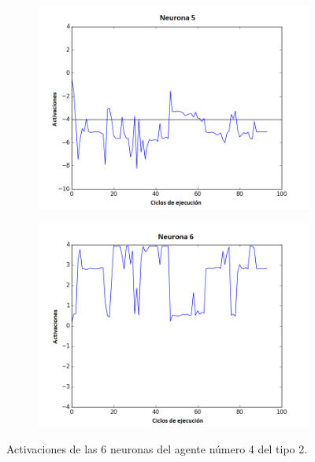 \begin{figure}[!h]
\begin{subfigure}{0.33\textwidth}
  \includegraphics[width=\linewidth]{Imagenes/Agente2Activaciones/Agente3/Neurona4}
\end{subfigure}\hfil %
\begin{subfigure}{0.33\textwidth}
  \includegraphics[width=\linewidth]{Imagenes/Agente2Activaciones/Agente3/Neurona5}
\end{subfigure}
\caption{Activaciones de las 6 neuronas del agente número 4 del tipo 2.}
\end{figure}

